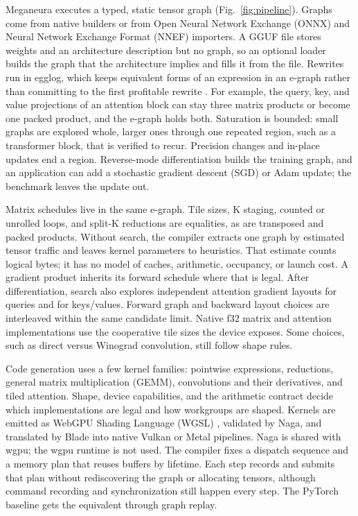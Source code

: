 \documentclass[conference]{IEEEtran}
\newcommand{\system}{Meganeura}
\begin{document}
\system{} executes a typed, static tensor graph (Fig.~\ref{fig:pipeline}).
Graphs come from native builders or from Open Neural Network Exchange (ONNX)
and Neural Network Exchange Format (NNEF) importers. A GGUF file stores
weights and an architecture description but no graph, so an optional loader
builds the graph that the architecture implies and fills it from the file. Rewrites run in egglog,
which keeps equivalent forms of an expression in an e-graph rather than
committing to the first profitable rewrite \cite{zhang2023egglog}. For
example, the query, key, and value projections of an attention block can
stay three matrix products or become one packed product, and the e-graph
holds both. Saturation is bounded: small graphs are explored whole, larger
ones through one repeated region, such as a transformer block, that is
verified to recur. Precision changes and in-place updates end a region.
Reverse-mode differentiation builds the training graph, and an application
can add a stochastic gradient descent (SGD) or Adam update; the benchmark
leaves the update out.

Matrix schedules live in the same e-graph. Tile sizes, K staging, counted or
unrolled loops, and split-K reductions are equalities, as are transposed and
packed products. Without search, the compiler extracts one graph by estimated
tensor traffic and leaves kernel parameters to heuristics. That estimate
counts logical bytes; it has no model of caches, arithmetic, occupancy, or
launch cost. A gradient product inherits its forward schedule where that is
legal. After differentiation, search also explores independent attention
gradient layouts for queries and for keys/values. Forward graph and backward
layout choices are interleaved within the same candidate limit. Native f32
matrix and attention implementations use the cooperative tile sizes the
device exposes. Some choices, such as direct versus Winograd convolution,
still follow shape rules.

Code generation uses a few kernel families: pointwise expressions,
reductions, general matrix multiplication (GEMM), convolutions and their
derivatives, and tiled attention. Shape, device capabilities, and the
arithmetic contract decide which implementations are legal and how
workgroups are shaped. Kernels are emitted as WebGPU Shading Language (WGSL)
\cite{w3c2026wgsl}, validated by Naga, and translated by Blade into native
Vulkan or Metal pipelines. Naga is shared with wgpu; the wgpu runtime is not
used. The compiler fixes a dispatch sequence and a memory plan that reuses
buffers by lifetime. Each step records and submits that plan without
rediscovering the graph or allocating tensors, although command recording
and synchronization still happen every step. The PyTorch baseline gets the
equivalent through graph replay.
\end{document}
